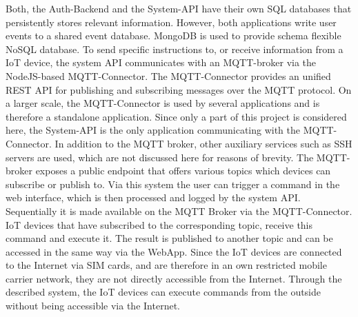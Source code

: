         Both, the Auth-Backend and the System-\ac{API} have their own SQL databases that persistently stores relevant information. However, both applications write user events to a shared event database. MongoDB is used to provide schema flexible NoSQL database. To send specific instructions to, or receive information from a \ac{IoT} device, the system \ac{API} communicates with an MQTT-broker via the NodeJS-based MQTT-Connector. The MQTT-Connector provides an unified \ac{REST} \ac{API} for publishing and subscribing messages over the MQTT protocol. On a larger scale, the MQTT-Connector is used by several applications and is therefore a standalone application. Since only a part of this project is considered here, the System-\ac{API} is the only application communicating with the MQTT-Connector. In addition to the MQTT broker, other auxiliary services such as SSH servers are used, which are not discussed here for reasons of brevity. The MQTT-broker exposes a public endpoint that offers various topics which devices can subscribe or publish to. Via this system the user can trigger a command in the web interface, which is then processed and logged by the system \ac{API}. Sequentially it is made available on the MQTT Broker via the MQTT-Connector. \ac{IoT} devices that have subscribed to the corresponding topic, receive this command and execute it. The result is published to another topic and can be accessed in the same way via the WebApp. Since the \ac{IoT} devices are connected to the Internet via SIM cards, and are therefore in an own restricted mobile carrier network, they are not directly accessible from the Internet. Through the described system, the IoT devices can execute commands from the outside without being accessible via the Internet.

